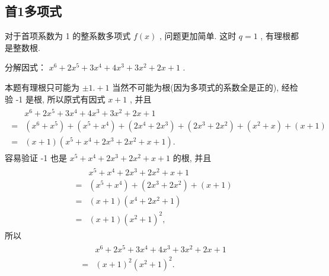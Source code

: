 \subsection{首1多项式}
对于首项系数为 1 的整系数多项式 $f(x)$ , 问题更加简单. 这时 $q=1$ , 有理根都是整数根. 

\begin{example}
	分解因式： $x^{6}+2 x^{5}+3 x^{4}+4 x^{3}+3 x^{2}+2 x+1$ . 
\end{example}
\begin{solution}
	本题有理根只可能为 $\pm 1 .+1$ 当然不可能为根(因为多项式的系数全是正的), 经检验 -1 是根, 所以原式有因式 $x+1$ , 并且
	\begin{align*}
		\begin{aligned}
			  & x^{6}+2 x^{5}+3 x^{4}+4 x^{3}+3 x^{2}+2 x+1                                                                                            \\
			= & \left(x^{6}+x^{5}\right)+\left(x^{5}+x^{4}\right)+\left(2 x^{4}+2 x^{3}\right)+\left(2 x^{3}+2 x^{2}\right)+\left(x^{2}+x\right)+(x+1) \\
			= & (x+1)\left(x^{5}+x^{4}+2 x^{3}+2 x^{2}+x+1\right) .
		\end{aligned}
	\end{align*}
	容易验证 -1 也是 $x^{5}+x^{4}+2 x^{3}+2 x^{2}+x+1$ 的根, 并且
	\begin{align*}
		\begin{aligned}
			  & x^{5}+x^{4}+2 x^{3}+2 x^{2}+x+1                             \\
			= & \left(x^{5}+x^{4}\right)+\left(2 x^{3}+2 x^{2}\right)+(x+1) \\
			= & (x+1)\left(x^{4}+2 x^{2}+1\right)                           \\
			= & (x+1)\left(x^{2}+1\right)^{2},
		\end{aligned}
	\end{align*}
	所以
	\begin{align*}
		\begin{aligned}
			  & x^{6}+2 x^{5}+3 x^{4}+4 x^{3}+3 x^{2}+2 x+1 \\
			= & (x+1)^{2}\left(x^{2}+1\right)^{2} .
		\end{aligned}
	\end{align*}
\end{solution}

